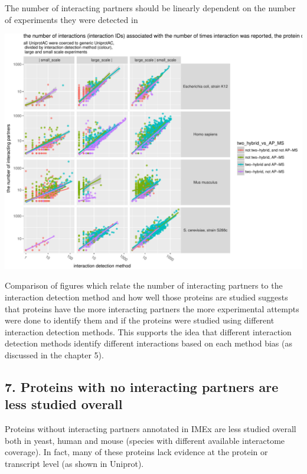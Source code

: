 \documentclass[]{article}
\begin{document}
The number of interacting partners should be linearly dependent on the
number of experiments they were detected in

\includegraphics{final_report_files/figure-latex/interaction_properties_vs_unique_interaction_IDs_vs_unique_interactors-1.pdf}

Comparison of figures which relate the number of interacting partners to
the interaction detection method and how well those proteins are studied
suggests that proteins have the more interacting partners the more
experimental attempts were done to identify them and if the proteins
were studied using different interaction detection methods. This
supports the idea that different interaction detection methods identify
different interactions based on each method bias (as discussed in the
chapter 5).

\subsection{7. Proteins with no interacting partners are less studied
overall}\label{proteins-with-no-interacting-partners-are-less-studied-overall}

Proteins without interacting partners annotated in IMEx are less studied
overall both in yeast, human and mouse (species with different available
interactome coverage). In fact, many of these proteins lack evidence at
the protein or transcript level (as shown in Uniprot).
\end{document}
